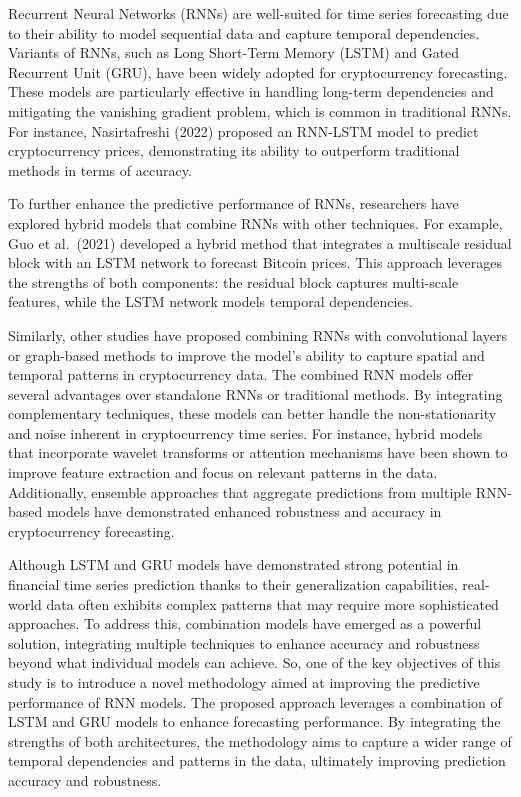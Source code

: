 \documentclass[]{interact}
\theoremstyle{plain}%
\theoremstyle{definition}
\theoremstyle{remark}
\begin{document}
Recurrent Neural Networks (RNNs) are well-suited for time series
forecasting due to their ability to model sequential data and capture
temporal dependencies. Variants of RNNs, such as Long Short-Term Memory
(LSTM) and Gated Recurrent Unit (GRU), have been widely adopted for
cryptocurrency forecasting. These models are particularly effective in
handling long-term dependencies and mitigating the vanishing gradient
problem, which is common in traditional RNNs. For instance,
Nasirtafreshi (2022) proposed an RNN-LSTM model to predict
cryptocurrency prices, demonstrating its ability to outperform
traditional methods in terms of accuracy.

To further enhance the predictive performance of RNNs, researchers have
explored hybrid models that combine RNNs with other techniques. For
example, Guo et al.~(2021) developed a hybrid method that integrates a
multiscale residual block with an LSTM network to forecast Bitcoin
prices. This approach leverages the strengths of both components: the
residual block captures multi-scale features, while the LSTM network
models temporal dependencies.

Similarly, other studies have proposed combining RNNs with convolutional
layers or graph-based methods to improve the model's ability to capture
spatial and temporal patterns in cryptocurrency data. The combined RNN
models offer several advantages over standalone RNNs or traditional
methods. By integrating complementary techniques, these models can
better handle the non-stationarity and noise inherent in cryptocurrency
time series. For instance, hybrid models that incorporate wavelet
transforms or attention mechanisms have been shown to improve feature
extraction and focus on relevant patterns in the data. Additionally,
ensemble approaches that aggregate predictions from multiple RNN-based
models have demonstrated enhanced robustness and accuracy in
cryptocurrency forecasting.

Although LSTM and GRU models have demonstrated strong potential in
financial time series prediction thanks to their generalization
capabilities, real-world data often exhibits complex patterns that may
require more sophisticated approaches. To address this, combination
models have emerged as a powerful solution, integrating multiple
techniques to enhance accuracy and robustness beyond what individual
models can achieve. So, one of the key objectives of this study is to
introduce a novel methodology aimed at improving the predictive
performance of RNN models. The proposed approach leverages a combination
of LSTM and GRU models to enhance forecasting performance. By
integrating the strengths of both architectures, the methodology aims to
capture a wider range of temporal dependencies and patterns in the data,
ultimately improving prediction accuracy and robustness.
\end{document}
